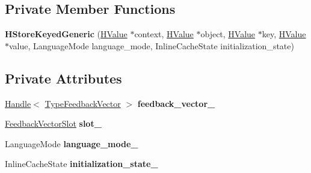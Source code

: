 \subsection*{Private Member Functions}
\begin{DoxyCompactItemize}
\item 
{\bfseries H\+Store\+Keyed\+Generic} (\hyperlink{classv8_1_1internal_1_1_h_value}{H\+Value} $\ast$context, \hyperlink{classv8_1_1internal_1_1_h_value}{H\+Value} $\ast$object, \hyperlink{classv8_1_1internal_1_1_h_value}{H\+Value} $\ast$key, \hyperlink{classv8_1_1internal_1_1_h_value}{H\+Value} $\ast$value, Language\+Mode language\+\_\+mode, Inline\+Cache\+State initialization\+\_\+state)\hypertarget{classv8_1_1internal_1_1_h_store_keyed_generic_a9a4902a7bb0c4475940ee8b32efb743e}{}\label{classv8_1_1internal_1_1_h_store_keyed_generic_a9a4902a7bb0c4475940ee8b32efb743e}

\end{DoxyCompactItemize}
\subsection*{Private Attributes}
\begin{DoxyCompactItemize}
\item 
\hyperlink{classv8_1_1internal_1_1_handle}{Handle}$<$ \hyperlink{classv8_1_1internal_1_1_type_feedback_vector}{Type\+Feedback\+Vector} $>$ {\bfseries feedback\+\_\+vector\+\_\+}\hypertarget{classv8_1_1internal_1_1_h_store_keyed_generic_a5eb86609667e5519a488d59f76f46d14}{}\label{classv8_1_1internal_1_1_h_store_keyed_generic_a5eb86609667e5519a488d59f76f46d14}

\item 
\hyperlink{classv8_1_1internal_1_1_feedback_vector_slot}{Feedback\+Vector\+Slot} {\bfseries slot\+\_\+}\hypertarget{classv8_1_1internal_1_1_h_store_keyed_generic_a4f0852ab105a1043933e06910b17ffd4}{}\label{classv8_1_1internal_1_1_h_store_keyed_generic_a4f0852ab105a1043933e06910b17ffd4}

\item 
Language\+Mode {\bfseries language\+\_\+mode\+\_\+}\hypertarget{classv8_1_1internal_1_1_h_store_keyed_generic_a868b6c4acc9ad49289b7a42f99e64311}{}\label{classv8_1_1internal_1_1_h_store_keyed_generic_a868b6c4acc9ad49289b7a42f99e64311}

\item 
Inline\+Cache\+State {\bfseries initialization\+\_\+state\+\_\+}\hypertarget{classv8_1_1internal_1_1_h_store_keyed_generic_a5e49f38af44f6f8839a1e70722739601}{}\label{classv8_1_1internal_1_1_h_store_keyed_generic_a5e49f38af44f6f8839a1e70722739601}

\end{DoxyCompactItemize}
